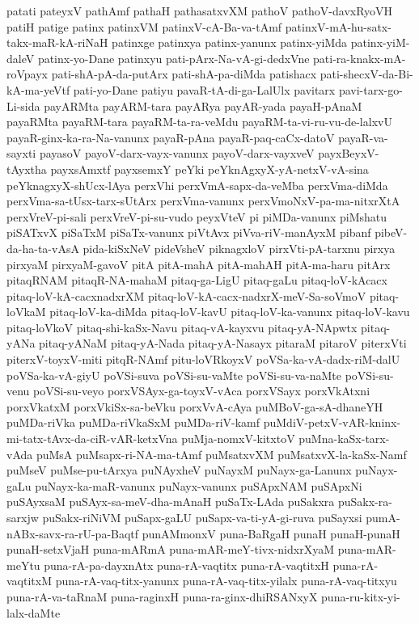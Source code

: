 {patati
pateyxV
pathAmf
pathaH
pathasatxvXM
pathoV
pathoV-davxRyoVH
patiH
patige
patinx
patinxVM
patinxV-cA-Ba-va-tAmf
patinxV-mA-hu-satx-takx-maR-kA-riNaH
patinxge
patinxya
patinx-yanunx
patinx-yiMda
patinx-yiM-daleV
patinx-yo-Dane
patinxyu
pati-pArx-Na-vA-gi-dedxVne
pati-ra-knakx-mA-roVpayx
pati-shA-pA-da-putArx
pati-shA-pa-diMda
patishacx
pati-shecxV-da-Bi-kA-ma-yeVtf
pati-yo-Dane
patiyu
pavaR-tA-di-ga-LalUlx
pavitarx
pavi-tarx-go-Li-sida
payARMta
payARM-tara
payARya
payAR-yada
payaH-pAnaM
payaRMta
payaRM-tara
payaRM-ta-ra-veMdu
payaRM-ta-vi-ru-vu-de-lalxvU
payaR-ginx-ka-ra-Na-vanunx
payaR-pAna
payaR-paq-caCx-datoV
payaR-va-sayxti
payasoV
payoV-darx-vayx-vanunx
payoV-darx-vayxveV
payxBeyxV-tAyxtha
payxsAmxtf
payxsemxY
peYki
peYknAgxyX-yA-netxV-vA-sina
peYknagxyX-shUcx-lAya
perxVhi
perxVmA-sapx-da-veMba
perxVma-diMda
perxVma-sa-tUsx-tarx-sUtArx
perxVma-vanunx
perxVmoNxV-pa-ma-nitxrXtA
perxVreV-pi-sali
perxVreV-pi-su-vudo
peyxVteV
pi
piMDa-vanunx
piMshatu
piSATxvX
piSaTxM
piSaTx-vanunx
piVtAvx
piVva-riV-manAyxM
pibanf
pibeV-da-ha-ta-vAsA
pida-kiSxNeV
pideVsheV
piknagxloV
pirxVti-pA-tarxnu
pirxya
pirxyaM
pirxyaM-gavoV
pitA
pitA-mahA
pitA-mahAH
pitA-ma-haru
pitArx
pitaqRNAM
pitaqR-NA-mahaM
pitaq-ga-LigU
pitaq-gaLu
pitaq-loV-kAcacx
pitaq-loV-kA-cacxnadxrXM
pitaq-loV-kA-cacx-nadxrX-meV-Sa-soVmoV
pitaq-loVkaM
pitaq-loV-ka-diMda
pitaq-loV-kavU
pitaq-loV-ka-vanunx
pitaq-loV-kavu
pitaq-loVkoV
pitaq-shi-kaSx-Navu
pitaq-vA-kayxvu
pitaq-yA-NApwtx
pitaq-yANa
pitaq-yANaM
pitaq-yA-Nada
pitaq-yA-Nasayx
pitaraM
pitaroV
piterxVti
piterxV-toyxV-miti
pitqR-NAmf
pitu-loVRkoyxV
poVSa-ka-vA-dadx-riM-dalU
poVSa-ka-vA-giyU
poVSi-suva
poVSi-su-vaMte
poVSi-su-va-naMte
poVSi-su-venu
poVSi-su-veyo
porxVSAyx-ga-toyxV-vAca
porxVSayx
porxVkAtxni
porxVkatxM
porxVkiSx-sa-beVku
porxVvA-cAya
puMBoV-ga-sA-dhaneYH
puMDa-riVka
puMDa-riVkaSxM
puMDa-riV-kamf
puMdiV-petxV-vAR-kninx-mi-tatx-tAvx-da-ciR-vAR-ketxVna
puMja-nomxV-kitxtoV
puMna-kaSx-tarx-vAda
puMsA
puMsapx-ri-NA-ma-tAmf
puMsatxvXM
puMsatxvX-la-kaSx-Namf
puMseV
puMse-pu-tArxya
puNAyxheV
puNayxM
puNayx-ga-Lanunx
puNayx-gaLu
puNayx-ka-maR-vanunx
puNayx-vanunx
puSApxNAM
puSApxNi
puSAyxsaM
puSAyx-sa-meV-dha-mAnaH
puSaTx-LAda
puSakxra
puSakx-ra-sarxjw
puSakx-riNiVM
puSapx-gaLU
puSapx-va-ti-yA-gi-ruva
puSayxsi
pumA-nABx-savx-ra-rU-pa-Baqtf
punAMmonxV
puna-BaRgaH
punaH
punaH-punaH
punaH-setxVjaH
puna-mARmA
puna-mAR-meY-tivx-nidxrXyaM
puna-mAR-meYtu
puna-rA-pa-dayxnAtx
puna-rA-vaqtitx
puna-rA-vaqtitxH
puna-rA-vaqtitxM
puna-rA-vaq-titx-yanunx
puna-rA-vaq-titx-yilalx
puna-rA-vaq-titxyu
puna-rA-va-taRnaM
puna-raginxH
puna-ra-ginx-dhiRSANxyX
puna-ru-kitx-yi-lalx-daMte
}
